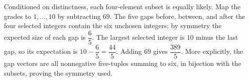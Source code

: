 Conditioned on distinctness, each four-element subset is equally likely. Map the grades to $1,\ldots,10$ by subtracting $69$. The five gaps before, between, and after the four selected integers contain the six unchosen integers; by symmetry the expected size of each gap is $\dfrac{6}{5}$. The largest selected integer is $10$ minus the last gap, so its expectation is $10-\dfrac{6}{5}=\dfrac{44}{5}$. Adding $69$ gives $\boxed{\dfrac{389}{5}}$. More explicitly, the gap vectors are all nonnegative five-tuples summing to six, in bijection with the subsets, proving the symmetry used.
